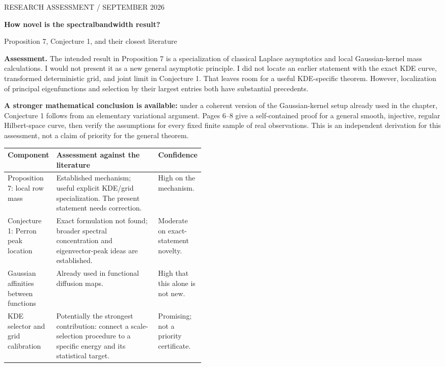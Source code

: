 \documentclass[10pt,a4paper]{article}
\newcommand{\subhead}[1]{\par\vspace{5pt}{\large\bfseries\color{ink}#1}\par}
\begin{document}
{\small\color{muted}RESEARCH ASSESSMENT \quad /  SEPTEMBER 2026}\par
\vspace{7pt}
{\Huge\bfseries\color{ink}How novel is the spectral\newline bandwidth result?}\par
\vspace{7pt}
{\large Proposition 7, Conjecture 1, and their closest literature}\par
\vspace{7pt}
\textbf{Assessment.} The intended result in Proposition 7 is a specialization of classical Laplace asymptotics and local Gaussian-kernel mass calculations. I would not present it as a new general asymptotic principle. I did not locate an earlier statement with the exact KDE curve, transformed deterministic grid, and joint limit in Conjecture 1. That leaves room for a useful KDE-specific theorem. However, localization of principal eigenfunctions and selection by their largest entries both have substantial precedents.

\textbf{A stronger mathematical conclusion is available:} under a coherent version of the Gaussian-kernel setup already used in the chapter, Conjecture 1 follows from an elementary variational argument. Pages 6--8 give a self-contained proof for a general smooth, injective, regular Hilbert-space curve, then verify the assumptions for every fixed finite sample of real observations. This is an independent derivation for this assessment, not a claim of priority for the general theorem.

\subhead{What can reasonably be claimed?}
\begin{tabularx}{\linewidth}{@{}>{\raggedright\arraybackslash}p{0.24\linewidth}X >{\raggedright\arraybackslash}p{0.21\linewidth}@{}}
\toprule
\textbf{Component} & \textbf{Assessment against the literature} & \textbf{Confidence}\\
\midrule
Proposition 7: local row mass & Established mechanism; useful explicit KDE/grid specialization. The present statement needs correction. & High on the mechanism.\\
Conjecture 1: Perron peak location & Exact formulation not found; broader spectral concentration and eigenvector-peak ideas are established. & Moderate on exact-statement novelty.\\
Gaussian affinities between functions & Already used in functional diffusion maps. & High that this alone is not new.\\
KDE selector and grid calibration & Potentially the strongest contribution: connect a scale-selection procedure to a specific energy and its statistical target. & Promising; not a priority certificate.\\
\bottomrule
\end{tabularx}
\end{document}
